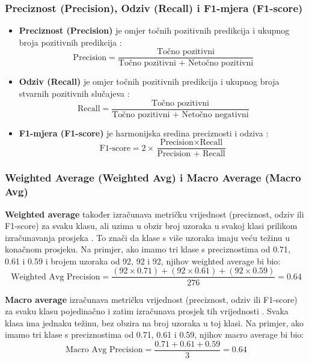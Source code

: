 \documentclass[zavrsnirad]{fer}
\begin{document}
\subsubsection{Preciznost (Precision), Odziv (Recall) i F1-mjera (F1-score)}

\begin{itemize}
	\item \textbf{Preciznost (Precision)} je omjer točnih pozitivnih predikcija i ukupnog broja pozitivnih predikcija \cite{medium_confusion_matrix}:
	\begin{equation}
		\text{Precision} = \frac{\text{Točno pozitivni}}{\text{Točno pozitivni + Netočno pozitivni}}
	\end{equation}
	\item \textbf{Odziv (Recall)} je omjer točnih pozitivnih predikcija i ukupnog broja stvarnih pozitivnih slučajeva \cite{medium_confusion_matrix}:
	\begin{equation}
		\text{Recall} = \frac{\text{Točno pozitivni}}{\text{Točno pozitivni + Netočno negativni}}
	\end{equation}
	\item \textbf{F1-mjera (F1-score)} je harmonijska sredina preciznosti i odziva \cite{towardsdatascience_confusion_matrix}:
	\begin{equation}
		\text{F1-score} = 2 \times \frac{\text{Precision} \times \text{Recall}}{\text{Precision + Recall}}
	\end{equation}
\end{itemize}


\subsubsection{Weighted Average (Weighted Avg) i Macro Average (Macro Avg)}

\textbf{Weighted average} također izračunava metričku vrijednost (preciznost, odziv ili F1-score) za svaku klasu, ali uzima u obzir broj uzoraka u svakoj klasi prilikom izračunavanja prosjeka \cite{Mathew2023}. To znači da klase s više uzoraka imaju veću težinu u konačnom prosjeku. Na primjer, ako imamo tri klase s preciznostima od 0.71, 0.61 i 0.59 i brojem uzoraka od 92, 92 i 92, njihov weighted average bi bio:
\[ \text{Weighted Avg Precision} = \frac{(92 \times 0.71) + (92 \times 0.61) + (92 \times 0.59)}{276} = 0.64 \]

\textbf{Macro average} izračunava metričku vrijednost (preciznost, odziv ili F1-score) za svaku klasu pojedinačno i zatim izračunava prosjek tih vrijednosti \cite{Mathew2023}. Svaka klasa ima jednaku težinu, bez obzira na broj uzoraka u toj klasi. Na primjer, ako imamo tri klase s preciznostima od 0.71, 0.61 i 0.59, njihov macro average bi bio:
\[ \text{Macro Avg Precision} = \frac{0.71 + 0.61 + 0.59}{3} = 0.64 \]
\end{document}
